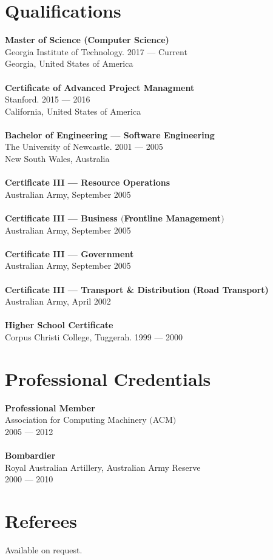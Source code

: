 \documentclass[a4paper]{article}
\begin{document}
\section*{Qualifications}
\textbf{Master of Science (Computer Science)}\\
Georgia Institute of Technology. 2017 --- Current\\Georgia, United States of America\\\\
\textbf{Certificate of Advanced Project Managment}\\
Stanford. 2015 --- 2016\\California, United States of America\\\\
\textbf{Bachelor of Engineering --- Software Engineering}\\
The University of Newcastle. 2001 --- 2005\\New South Wales, Australia\\\\
\textbf{Certificate III --- Resource Operations}\\
Australian Army, September 2005\\\\
\textbf{Certificate III --- Business $($Frontline Management$)$}\\
Australian Army, September 2005\\\\
\textbf{Certificate III --- Government}\\
Australian Army, September 2005\\\\
\textbf{Certificate III --- Transport \& Distribution (Road Transport)}\\
Australian Army, April 2002\\\\
\textbf{Higher School Certificate}\\
Corpus Christi College, Tuggerah. 1999 --- 2000
\vspace{5pt}
\section*{Professional Credentials}
\textbf{Professional Member}\\
Association for Computing Machinery $($ACM$)$\\
2005 --- 2012\\\\
\textbf{Bombardier}\\
Royal Australian Artillery, Australian Army Reserve\\
2000 --- 2010
\section*{Referees}
Available on request.
\end{document}
